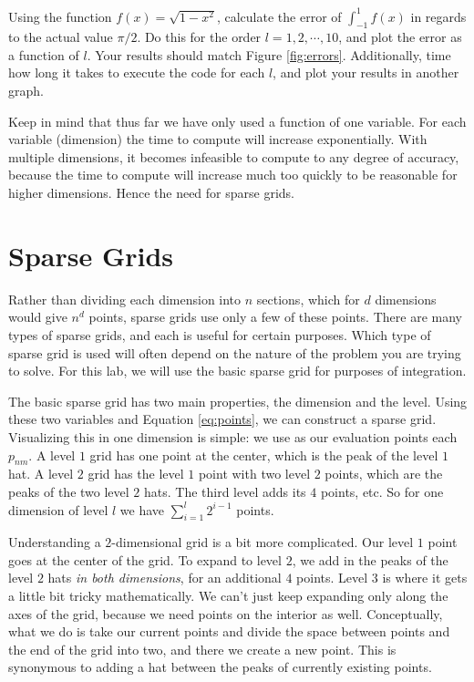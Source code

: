 \begin{problem}
Using the function $f(x)=\sqrt{1-x^2}$, calculate the error of $\int_{-1}^1 f(x)$ in regards to the actual value $\pi/2$.  Do this for the order $l = 1,2,\cdots,10$, and plot the error as a function of $l$.  Your results should match Figure \ref{fig:errors}.  Additionally, time how long it takes to execute the code for each $l$, and plot your results in another graph.
\end{problem}

Keep in mind that thus far we have only used a function of one variable.  For each variable (dimension) the time to compute will increase exponentially.   With multiple dimensions, it becomes infeasible to compute to any degree of accuracy, because the time to compute will increase much too quickly to be reasonable for higher dimensions.  Hence the need for sparse grids.

\section*{Sparse Grids}
Rather than dividing each dimension into $n$ sections, which for $d$ dimensions would give $n^d$ points, sparse grids use only a few of these points.  There are many types of sparse grids, and each is useful for certain purposes.  Which type of sparse grid is used will often depend on the nature of the problem you are trying to solve.  For this lab, we will use the basic sparse grid for purposes of integration.

The basic sparse grid has two main properties, the dimension and the level.  Using these two variables and Equation \ref{eq:points}, we can construct a sparse grid.  Visualizing this in one dimension is simple: we use as our evaluation points each $p_{nm}$.  A level $1$ grid has one point at the center, which is the peak of the level $1$ hat.  A level $2$ grid has the level $1$ point with two level $2$ points, which are the peaks of the two level $2$ hats.  The third level adds its $4$ points, etc.  So for one dimension of level $l$ we have $\sum_{i=1}^l 2^{i-1}$ points.

Understanding a $2$-dimensional grid  is a bit more complicated.  Our level $1$ point goes at the center of the grid.  To expand to level $2$, we add in the peaks of the level $2$ hats \emph{in both dimensions}, for an additional $4$ points.  Level $3$ is where it gets a little bit tricky mathematically.  We can't just keep expanding only along the axes of the grid, because we need points on the interior as well.  Conceptually, what we do is take our current points and divide the space between points and the end of the grid into two, and there we create a new point.  This is synonymous to adding a hat between the peaks of currently existing points.

